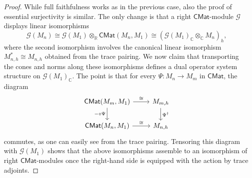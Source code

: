 \documentclass[11pt,onecolumn]{article}
\newcommand{\R}{\mathbb{R}}
\newcommand{\C}{\mathbb{C}}
\theoremstyle{plain}
\theoremstyle{remark}
\theoremstyle{definition}
\begin{document}
\begin{proof}
	While full faithfulness works as in the previous case,
	also the proof of essential surjectivity is similar.
	The only change is that a right $\mathsf{CMat}$-module $\mathcal{G}$ displays linear isomorphisms
	\begin{equation}
		\label{eq:dual_os_module_isomorphisms}
		\mathcal{G}(M_n)
		\cong
		\mathcal{G}(M_1)\otimes_\R \mathsf{CMat}(M_n,M_1)
		\cong
		(\mathcal{G}(M_1)_\C \otimes_\C M_n)_h,
	\end{equation}
	where the second isomorphism involves the canonical linear isomorphism $M_{n,h}^* \cong M_{n,h}$ obtained from the trace pairing.
	We now claim that transporting the cones and norms along these isomorphisms defines a dual operator system structure on $\mathcal{G}(M_1)_\C$.
	The point is that for every $\Psi \colon M_n \to M_m$ in $\mathsf{CMat}$, the diagram
	\[
		\begin{tikzcd}
			\mathsf{CMat}(M_m,M_1) \ar[r, "\cong"] \ar[d, "{-\circ\Psi}"'] & M_{m,h} \ar[d, "\Psi^\dagger"] \\
			\mathsf{CMat}(M_n,M_1) \ar[r, "\cong"] & M_{n,h}
		\end{tikzcd}
	\]
	commutes, as one can easily see from the trace pairing.
	Tensoring this diagram with $\mathcal{G}(M_1)$ shows that the above isomorphisms assemble to an isomorphism of right $\mathsf{CMat}$-modules once the right-hand side is equipped with the action by trace adjoints.


\end{proof}
\end{document}
